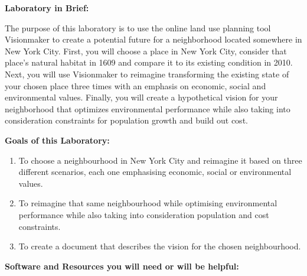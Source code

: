 \documentclass{article}
\begin{document}
\newpage


\large{\textbf{Laboratory in Brief:}}

\vspace{4mm}

\setlength{\leftskip}{1cm}

\setlength{\parindent}{0cm}

The purpose of this laboratory is to use the online land use planning tool Visionmaker to create a potential future for a neighborhood located somewhere in New York City.  First, you will choose a place in New York City, consider that place's natural habitat in 1609 and compare it to its existing condition in 2010.  Next, you will use Visionmaker  to reimagine transforming the existing state of your chosen place three times with an emphasis on economic, social and environmental values.  Finally, you will create a hypothetical vision for your neighborhood that optimizes environmental performance while also taking into consideration constraints for population growth and build out cost.

\vspace{4mm}

\setlength{\leftskip}{0cm}

\large{\textbf{Goals of this Laboratory:}}

\begin{enumerate}[leftmargin=15mm]

\item To choose a neighbourhood in New York City and reimagine it based on three different scenarios, each one emphasising economic, social or environmental values.

\item To reimagine that same neighbourhood while optimising environmental performance while also taking into consideration population and cost constraints.

\item To create a document that describes the vision for the chosen neighbourhood.

\end{enumerate}


\large{\textbf{Software and Resources you will need or will be helpful:}}
\end{document}
